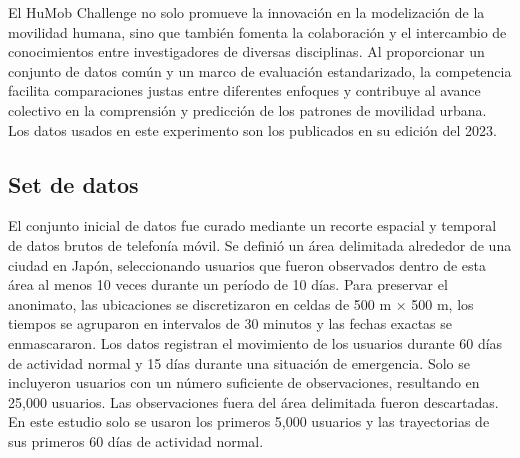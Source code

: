 El HuMob Challenge no solo promueve la innovación en la modelización de la movilidad humana, sino que también fomenta la colaboración y el intercambio de conocimientos entre investigadores de diversas disciplinas. Al proporcionar un conjunto de datos común y un marco de evaluación estandarizado, la competencia facilita comparaciones justas entre diferentes enfoques y contribuye al avance colectivo en la comprensión y predicción de los patrones de movilidad urbana. Los datos usados en este experimento son los publicados en su edición del 2023.

\subsection{Set de datos}

El conjunto inicial de datos fue curado mediante un recorte espacial y temporal de datos brutos de telefonía móvil. Se definió un área delimitada alrededor de una ciudad en Japón, seleccionando usuarios que fueron observados dentro de esta área al menos 10 veces durante un período de 10 días. Para preservar el anonimato, las ubicaciones se discretizaron en celdas de 500 m × 500 m, los tiempos se agruparon en intervalos de 30 minutos y las fechas exactas se enmascararon. Los datos registran el movimiento de los usuarios durante 60 días de actividad normal y 15 días durante una situación de emergencia. Solo se incluyeron usuarios con un número suficiente de observaciones, resultando en 25,000 usuarios. Las observaciones fuera del área delimitada fueron descartadas. En este estudio solo se usaron los primeros 5,000 usuarios y las trayectorias de sus primeros 60 días de actividad normal. 

